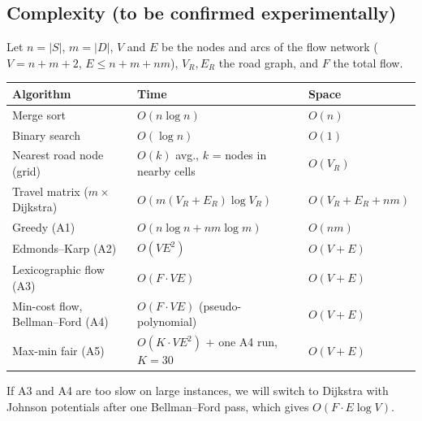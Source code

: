 \documentclass[11pt]{article}
\begin{document}
\subsection{Complexity (to be confirmed experimentally)}
Let $n=|S|$, $m=|D|$, $V$ and $E$ be the nodes and arcs of the flow network
($V = n+m+2$, $E \le n + m + nm$), $V_R, E_R$ the road graph, and $F$ the
total flow.
\begin{center}
\begin{tabular}{@{}lll@{}}
\toprule
\textbf{Algorithm} & \textbf{Time} & \textbf{Space}\\
\midrule
Merge sort & $O(n\log n)$ & $O(n)$\\
Binary search & $O(\log n)$ & $O(1)$\\
Nearest road node (grid) & $O(k)$ avg., $k$ = nodes in nearby cells & $O(V_R)$\\
Travel matrix ($m\times$ Dijkstra) & $O(m(V_R+E_R)\log V_R)$ & $O(V_R+E_R+nm)$\\
Greedy (A1) & $O(n\log n + nm\log m)$ & $O(nm)$\\
Edmonds--Karp (A2) & $O(VE^2)$ & $O(V+E)$\\
Lexicographic flow (A3) & $O(F\cdot VE)$ & $O(V+E)$\\
Min-cost flow, Bellman--Ford (A4) & $O(F\cdot VE)$ (pseudo-polynomial) & $O(V+E)$\\
Max-min fair (A5) & $O(K\cdot VE^2)$ + one A4 run, $K=30$ & $O(V+E)$\\
\bottomrule
\end{tabular}
\end{center}
If A3 and A4 are too slow on large instances, we will switch to Dijkstra with
Johnson potentials after one Bellman--Ford pass, which gives
$O(F\cdot E\log V)$.
\end{document}
